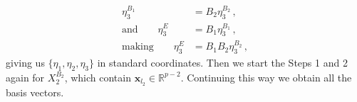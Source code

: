 \documentclass[letter,12pt]{article}
\begin{document}
{ \begin{align}\label{eq:changeOfBasis4}
      \eta_3^{B_1} & =   B_2  \eta_3^{B_2} \, , \\
    \text{and} \qquad  \eta_3^{E}  & =  B_1  \eta_3^{B_1} \, ,  \\
    \text{making} \qquad  \eta_3^{E}  & = B_1  B_2  \eta_3^{B_2} \, , 
 \end{align}
 giving us $\{\eta_1, \eta_2, \eta_3\}$ in standard coordinates. Then we start the Steps 1 and 2 again for $X_2^{B_2}$, which contain $\bm{x}_{l_2} \in \mathbb{R}^{p-2}$. Continuing this way we obtain all the basis vectors. 
}




\end{document}
